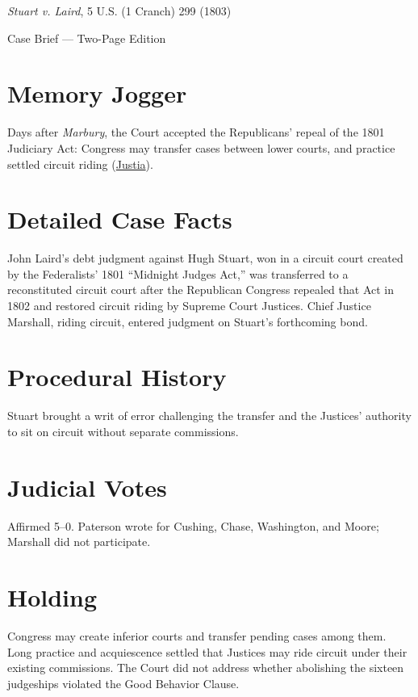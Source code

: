 \documentclass[12pt]{article}
\begin{document}
\begin{center}
{\LARGE \textit{Stuart v. Laird}, 5 U.S. (1 Cranch) 299 (1803)\par}
\vspace{0.5em}
{\large Case Brief --- Two-Page Edition\par}
\end{center}

\section{Memory Jogger}
Days after \textit{Marbury}, the Court accepted the Republicans' repeal of the 1801 Judiciary Act: Congress may transfer cases between lower courts, and practice settled circuit riding (\href{https://supreme.justia.com/cases/federal/us/5/299/}{Justia}).

\section{Detailed Case Facts}
John Laird's debt judgment against Hugh Stuart, won in a circuit court created by the Federalists' 1801 ``Midnight Judges Act,'' was transferred to a reconstituted circuit court after the Republican Congress repealed that Act in 1802 and restored circuit riding by Supreme Court Justices. Chief Justice Marshall, riding circuit, entered judgment on Stuart's forthcoming bond.

\section{Procedural History}
Stuart brought a writ of error challenging the transfer and the Justices' authority to sit on circuit without separate commissions.

\section{Judicial Votes}
Affirmed 5--0. Paterson wrote for Cushing, Chase, Washington, and Moore; Marshall did not participate.

\section{Holding}
Congress may create inferior courts and transfer pending cases among them. Long practice and acquiescence settled that Justices may ride circuit under their existing commissions. The Court did not address whether abolishing the sixteen judgeships violated the Good Behavior Clause.
\end{document}
